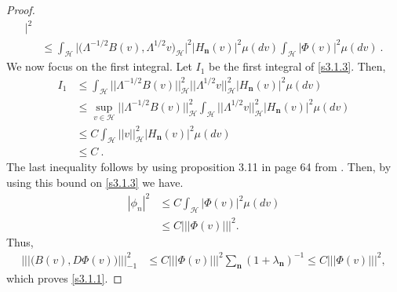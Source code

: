 \documentclass[review, onefignum, onetabnum]{siamart171218}
\begin{document}
\begin{proof}
\begin{equation}
\begin{aligned}
            \Bigg|^2
            \\
            &\le
            \int_{\mathcal{H}}
            \big|
                \big(
                    \Lambda^{-1/2}B(v),\Lambda^{1/2} v
                \big)_{\mathcal{H}}
            \big|^2
            \big|
                H_{\mathbf{n}}(v)
            \big|^2 \mu(dv)
            \int_{\mathcal{H}}
            \big|
                \Phi(v)
            \big|^2  \mu(dv)
            \ .
     \end{aligned}
\end{equation}
We now focus on the first integral. Let $I_1$ be the first integral of
\eqref{s3.1.3}. Then,
\begin{align*}
    I_1
        &
            \le \int_{\mathcal{H}} \big| \big| \Lambda^{-1/2} B(v)
            \big| \big|_{\mathcal{H}}^2
            \big| \big| 
                \Lambda^{1/2}v 
            \big|\big|_{\mathcal{H}}^2
            \big|H_{\mathbf{n}}(v)\big|^2 \mu(dv)
            \\
        &
            \le \sup_{v\in\mathcal{H}} 
            \big|\big|\Lambda^{-1/2}B(v)
            \big|\big|_{\mathcal{H}}^2
            \int_{\mathcal{H}} 
            \big|\big|
                \Lambda^{1/2}v 
            \big|\big|_{\mathcal{H}}^2
            \big|H_{\mathbf{n}}(v)\big|^2 \mu(dv)
            \\
        & 
            \le C \int_{\mathcal{H}} 
            \big|\big| v \big|\big|_{\mathcal{H}}^2
            \big|H_{\mathbf{n}}(v)\big|^2 \mu(dv)
        \\
        & 
            \le C \ .
\end{align*}
%
The last inequality follows by using proposition 3.11 in page 64 from
\cite{da1}. Then, by using this bound on \eqref{s3.1.3} we have.
\begin{align*}
    | \phi_n |^2 &\le C \int_{\mathcal{H}}\big|  \Phi(v)\big|^2  \mu(dv)\\
    &\le C |||\Phi(v) |||^2  .
\end{align*}
Thus,
\begin{align*}
    ||| \big(B(v),D\Phi(v) \big) |||_{-1}^2 
        &\le C |||\Phi(v) |||^2
        \sum_{\mathbf{n}} (1+\lambda_{\mathbf{n}})^{-1}  
        \le C |||\Phi(v) |||^2 ,
\end{align*}
 which proves \eqref{s3.1.1}.


\end{proof}
\end{document}
